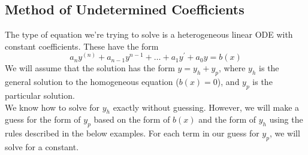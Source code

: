\subsection{Method of Undetermined Coefficients}
\noindent
The type of equation we're trying to solve is a heterogeneous linear ODE with constant coefficients. These have the form
\begin{equation*}
	a_ny^{(n)} + a_{n-1}y^{n-1} + \ldots + a_1y^\prime + a_0y = b(x)
\end{equation*}
We will assume that the solution has the form $y = y_h + y_p$, where $y_h$ is the general solution to the homogeneous equation ($b(x) = 0$), and $y_p$ is the particular solution.\\

\noindent
We know how to solve for $y_h$ exactly without guessing. However, we will make a guess for the form of $y_p$ based on the form of $b(x)$ and the form of $y_h$ using the rules described in the below examples. For each term in our guess for $y_p$, we will solve for a constant.\\

\ifodd{}\fi